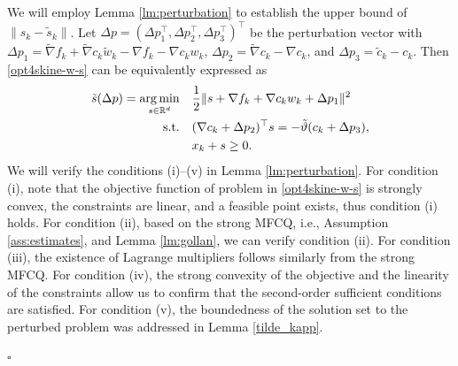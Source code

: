 \documentclass[11pt]{article}
\newenvironment{proof}{{\noindent\it Proof.}\quad}{\hfill $\square$\par}
\newcommand{\R}{\mathbb{R}}
\newcommand{\argmin}{\mathop{\mathrm{arg\,min}}}
\newcommand{\be}{\begin{equation}}
\newcommand{\ee}{\end{equation}}
\begin{document}
\begin{proof}
    We will employ Lemma \ref{lm:perturbation} to establish the upper bound of \(\|s_k - \tilde{s}_k\|\). 
    Let \(\Delta p = (\Delta p_1^\top,\Delta p_2^\top,\Delta p_3^\top)^\top \) be the perturbation vector with \(\Delta p_1 = \tilde{\nabla} f_k + \tilde{\nabla} c_k \tilde w_k - \nabla f_k - \nabla c_k w_k\), \(\Delta p_2 = \tilde{\nabla} c_k - \nabla c_k\), and \(\Delta p_3 = \tilde{c}_k - c_k\). Then  \eqref{opt4skine-w-s} can be equivalently expressed as 
    \be\begin{aligned}\label{opt4skine-w-s2}
    \tilde s(\Delta p) = \argmin_{s\in\R^d}& \quad  \frac{1}{2}\|s+ \nabla f_k + \nabla c_k w_k + \Delta p_1\|^2 \\
    ~{\rm s.t.}&\quad (\nabla c_k + \Delta p_2)^\top s = -\tilde \vartheta (c_k + \Delta p_3),\\
    &\quad  x_k + s \geq 0.
    \end{aligned}\ee
    We will  verify the conditions (i)--(v) in Lemma \ref{lm:perturbation}. For condition (i), note that the objective function of  problem in \eqref{opt4skine-w-s} is strongly convex, the constraints are linear, and a feasible point exists, thus  condition (i) holds. For condition (ii), based on the strong MFCQ, i.e., Assumption \ref{ass:estimates}, and Lemma \ref{lm:gollan}, we can verify condition (ii). For condition (iii), the existence of Lagrange multipliers follows similarly from the strong MFCQ. For condition (iv), the strong convexity of the objective and the linearity of the constraints allow us to confirm that the second-order sufficient conditions are satisfied. For condition (v), the boundedness of the solution set to the perturbed problem was addressed in Lemma \ref{tilde_kapp}.%
    

\end{proof}
\end{document}
